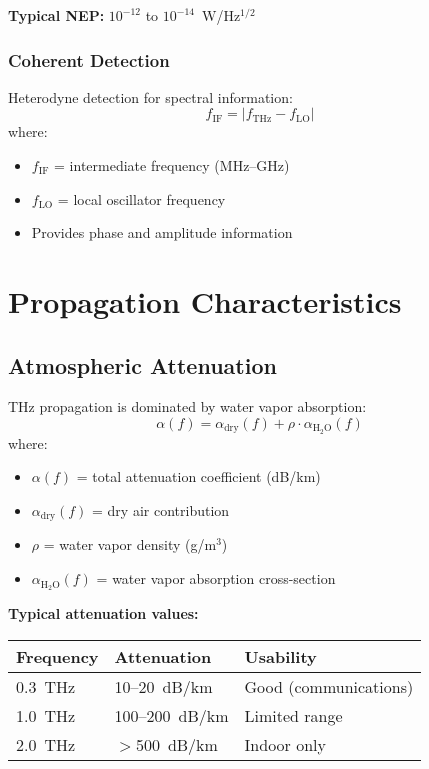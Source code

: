 \textbf{Typical NEP:} $10^{-12}$ to $10^{-14}$~W/Hz$^{1/2}$

\subsubsection{Coherent Detection}

Heterodyne detection for spectral information:
\begin{equation}
f_{\text{IF}} = |f_{\text{THz}} - f_{\text{LO}}|
\end{equation}
where:
\begin{itemize}
\item $f_{\text{IF}}$ = intermediate frequency (MHz--GHz)
\item $f_{\text{LO}}$ = local oscillator frequency
\item Provides phase and amplitude information
\end{itemize}

\section{Propagation Characteristics}

\subsection{Atmospheric Attenuation}

THz propagation is dominated by water vapor absorption:
\begin{equation}
\alpha(f) = \alpha_{\text{dry}}(f) + \rho \cdot \alpha_{\text{H}_2\text{O}}(f)
\end{equation}
where:
\begin{itemize}
\item $\alpha(f)$ = total attenuation coefficient (dB/km)
\item $\alpha_{\text{dry}}(f)$ = dry air contribution
\item $\rho$ = water vapor density (g/m$^3$)
\item $\alpha_{\text{H}_2\text{O}}(f)$ = water vapor absorption cross-section
\end{itemize}

\textbf{Typical attenuation values:}

\begin{center}
\begin{tabular}{@{}lll@{}}
\toprule
Frequency & Attenuation & Usability \\
\midrule
0.3~THz & 10--20~dB/km & Good (communications) \\
1.0~THz & 100--200~dB/km & Limited range \\
2.0~THz & $>$500~dB/km & Indoor only \\
\bottomrule
\end{tabular}
\end{center}

